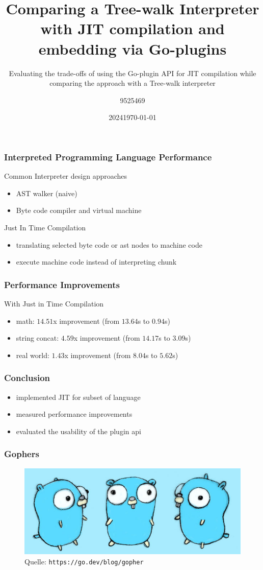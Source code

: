 \documentclass{beamer}
\title{Comparing a Tree-walk Interpreter with JIT compilation and embedding via Go-plugins}
\subtitle{Evaluating the trade-offs of using the Go-plugin API for JIT compilation while comparing the approach with a Tree-walk interpreter}
\date[2024]{2024}
\author{9525469}
\institute[DHBW]{DHBW}
\date{\today}
\begin{document}
    
    \frame{\titlepage}

    \begin{frame}
        \frametitle{Interpreted Programming Language Performance}

        Common Interpreter design approaches

        \begin{itemize}
            \item AST walker (naive)
            \item Byte code compiler and virtual machine
        \end{itemize}

        Just In Time Compilation
        \begin{itemize}
            \item translating selected byte code or ast nodes to machine code
            \item execute machine code instead of interpreting chunk
        \end{itemize}
    \end{frame}

     \begin{frame}
        \frametitle{Performance Improvements}

        With Just in Time Compilation
        \begin{itemize}
            \item math: $14.51$x improvement (from $13.64$s to $0.94$s)
            \item string concat: $4.59$x improvement (from $14.17$s to $3.09$s)
            \item real world: $1.43$x improvement (from $8.04$s to $5.62$s)
        \end{itemize}
    \end{frame}

    \begin{frame}
        \frametitle{Conclusion}

        \begin{itemize}
            \item implemented JIT for subset of language
            \item measured performance improvements
            \item evaluated the usability of the plugin api
        \end{itemize}
    \end{frame}

    \begin{frame}
        \frametitle{Gophers}
        \begin{figure}
            \includegraphics[scale=8]{./gopher.jpg}
            \caption{Quelle: \texttt{https://go.dev/blog/gopher}}
        \end{figure}
    \end{frame}
\end{document}
